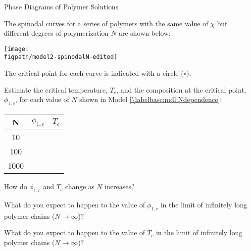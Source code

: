 \begin{activity}{Phase Diagrams of Polymer Solutions}
\begin{model}
	The spinodal curves for a series of polymers with the same value of $\chi$ but different degrees of polymerization $N$ are shown below:
	
	\centerline{\texttt{[image: \\figpath/model2-spinodalN-edited]}}
	
	The critical point for each curve is indicated with a circle ($\circ$).
	
\end{model}

\begin{ctqs}

	\question Estimate the critical temperature, $T_c$, and the composition at the critical point, $\phi_{1,c}$, for each value of $N$ shown in Model \ref{\labelbase:mdl:Ndependence}:
	
		\begin{center}
			\renewcommand{\arraystretch}{2.5}
			\begin{tabular}{|c|c|c|}
				\hline
				\textbf{N} & \hspace{0.6cm}$\phi_{1,c}$\hspace{0.6cm} & \hspace{0.75cm}$T_c$\hspace{0.75cm} \\\hline
				10 & & \\\hline
				100 & & \\\hline
				1000 & & \\\hline
			\end{tabular}
		\end{center}
		
	\question How do $\phi_{1,c}$ and $T_c$ change as $N$ increases?
	
		\begin{solution}[0.5in]
		\end{solution}
	
	\question What do you expect to happen to the value of $\phi_{1,c}$ in the limit of infinitely long polymer chains ($N\to\infty$)?
	
		\begin{solution}[0.5in]
		\end{solution}
		
	\question What do you expect to happen to the value of $T_c$ in the limit of infinitely long polymer chains ($N\to\infty$)?
	
		\begin{solution}[0.5in]
		\end{solution}

\end{ctqs}



\end{activity}
